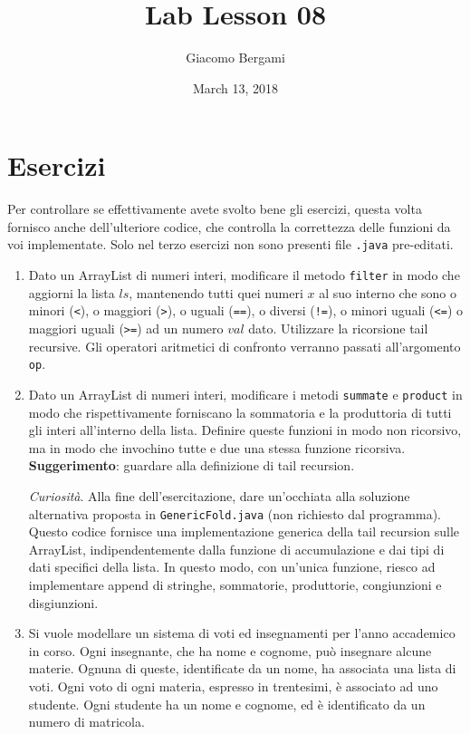 \documentclass[]{scrartcl}
\title{Lab Lesson 08}
\date{March 13, 2018}
\author{Giacomo Bergami}
\begin{document}
\maketitle
\section*{Esercizi}
Per controllare se effettivamente avete svolto bene gli esercizi, questa volta fornisco anche dell'ulteriore codice, che controlla la correttezza delle funzioni da voi implementate. Solo nel terzo esercizi non sono presenti file \texttt{.java} pre-editati.


\begin{enumerate}
\item Dato un ArrayList di numeri interi, modificare il metodo \texttt{filter} in modo che aggiorni la lista $ls$, mantenendo tutti quei numeri $x$ al suo interno che sono o minori (\texttt{<}), o maggiori (\texttt{>}), o uguali (\texttt{==}), o diversi (\texttt{!=}), o minori uguali (\texttt{<=}) o maggiori uguali (\texttt{>=}) ad un numero $val$ dato. Utilizzare la ricorsione tail recursive. Gli operatori aritmetici di confronto verranno passati all'argomento \texttt{op}.

	
\item Dato un ArrayList di numeri interi, modificare i metodi \texttt{summate} e \texttt{product} in modo che rispettivamente forniscano la sommatoria e la produttoria di tutti gli interi all'interno della lista. Definire queste funzioni in modo non ricorsivo, ma in modo che invochino tutte e due una stessa funzione ricorsiva. \textbf{Suggerimento}: guardare alla definizione di tail recursion.

\textit{Curiosità}. Alla fine dell'esercitazione, dare un'occhiata alla soluzione alternativa proposta in \texttt{GenericFold.java} (non richiesto dal programma). Questo codice fornisce una implementazione generica della tail recursion sulle ArrayList, indipendentemente dalla funzione di accumulazione e dai tipi di dati specifici della lista. In questo modo, con un'unica funzione, riesco ad implementare append di stringhe, sommatorie, produttorie, congiunzioni e disgiunzioni.

\item Si vuole modellare un sistema di voti ed insegnamenti per l'anno accademico in corso. Ogni insegnante, che ha nome e cognome, può insegnare alcune materie. Ognuna di queste, identificate da un nome, ha associata una lista di voti. Ogni voto di ogni materia, espresso in trentesimi, è associato ad uno studente. Ogni studente ha un nome e cognome, ed è identificato da un numero di matricola. 


\end{enumerate}
\end{document}
